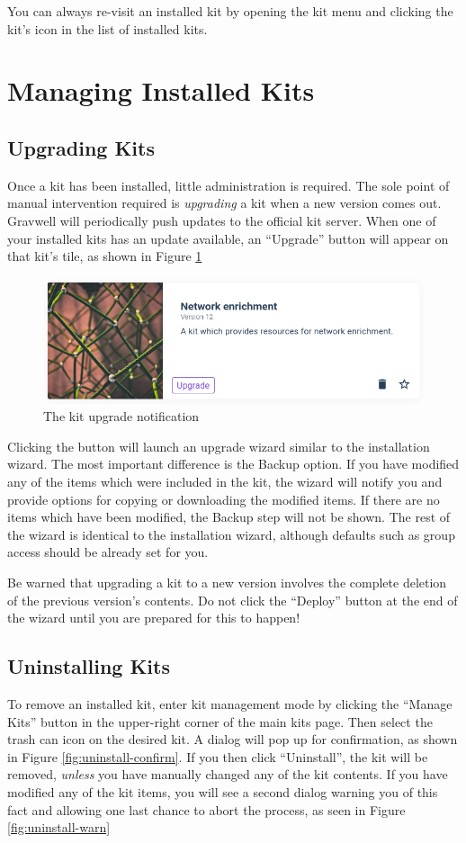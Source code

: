 You can always re-visit an installed kit by opening the kit menu and clicking the kit's icon in the list of installed kits.

\section{Managing Installed Kits}

\subsection{Upgrading Kits}
Once a kit has been installed, little administration is required. The sole point of manual intervention required is \emph{upgrading} a kit when a new version comes out. Gravwell will periodically push updates to the official kit server. When one of your installed kits has an update available, an ``Upgrade'' button will appear on that kit's tile, as shown in Figure \ref{fig:upgradekit}

\begin{figure}[H]
	\includegraphics[width=0.4\linewidth]{images/upgradekit.png}
	\caption{The kit upgrade notification}
	\label{fig:upgradekit}
\end{figure}

Clicking the button will launch an upgrade wizard similar to the installation wizard. The most important difference is the Backup option. If you have modified any of the items which were included in the kit, the wizard will notify you and provide options for copying or downloading the modified items. If there are no items which have been modified, the Backup step will not be shown. The rest of the wizard is identical to the installation wizard, although defaults such as group access should be already set for you.

Be warned that upgrading a kit to a new version involves the complete deletion of the previous version's contents. Do not click the ``Deploy'' button at the end of the wizard until you are prepared for this to happen!

\subsection{Uninstalling Kits}
To remove an installed kit, enter kit management mode by clicking the ``Manage Kits'' button in the upper-right corner of the main kits page. Then select the trash can icon on the desired kit. A dialog will pop up for confirmation, as shown in Figure \ref{fig:uninstall-confirm}. If you then click ``Uninstall'', the kit will be removed, \emph{unless} you have manually changed any of the kit contents. If you have modified any of the kit items, you will see a second dialog warning you of this fact and allowing one last chance to abort the process, as seen in Figure \ref{fig:uninstall-warn}

